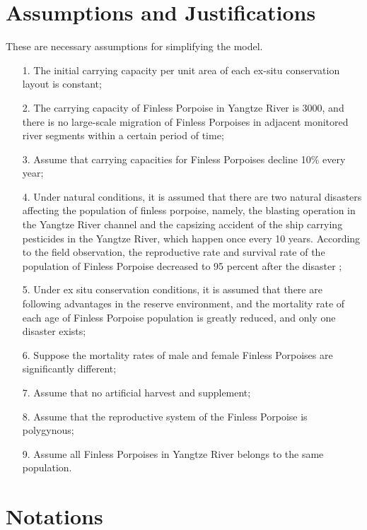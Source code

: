 \documentclass{mcmthesis}
\numberwithin{figure}{section}
\numberwithin{table}{section}
\numberwithin{equation}{section}
\begin{document}
\section{Assumptions and Justifications}
These are necessary assumptions for simplifying the model.
\begin{enumerate}
  \item [1.] The initial carrying capacity per unit area of each ex-situ conservation layout is constant;\label{assumption1}
  \item [2.] The carrying capacity of Finless Porpoise in Yangtze River is 3000, and there is no large-scale migration of Finless Porpoises in adjacent 
  monitored river segments within a certain period of time\citep*{Xiongyuanhui};
  \item [3.] Assume that carrying capacities for Finless Porpoises decline 10\% every year;
  \item [4.] Under natural conditions, it is assumed that there 
  are two natural disasters affecting the population of finless 
  porpoise, namely, the blasting operation in the Yangtze River 
  channel and the capsizing accident of the ship carrying 
  pesticides in the Yangtze River, which happen once every 
  10 years. According to the field observation, 
  the reproductive rate and survival rate of the population 
  of Finless Porpoise decreased to 95 percent after the disaster \citep*{Zhangxianfeng};
  \item [5.] Under ex situ conservation conditions, it is assumed 
  that there are following advantages in the reserve environment, 
  and the mortality rate of each age of Finless Porpoise population is 
  greatly reduced, and only one disaster exists;
  \item [6.] Suppose the mortality rates of male and female Finless Porpoises are significantly different;
  \item [7.] Assume that no artificial harvest and supplement;
  \item [8.] Assume that the reproductive system of the Finless Porpoise is polygynous;
  \item [9.] Assume all Finless Porpoises in Yangtze River belongs to the same population.
\end{enumerate}


\section{Notations}

\renewcommand\arraystretch{1.5}
\end{document}
